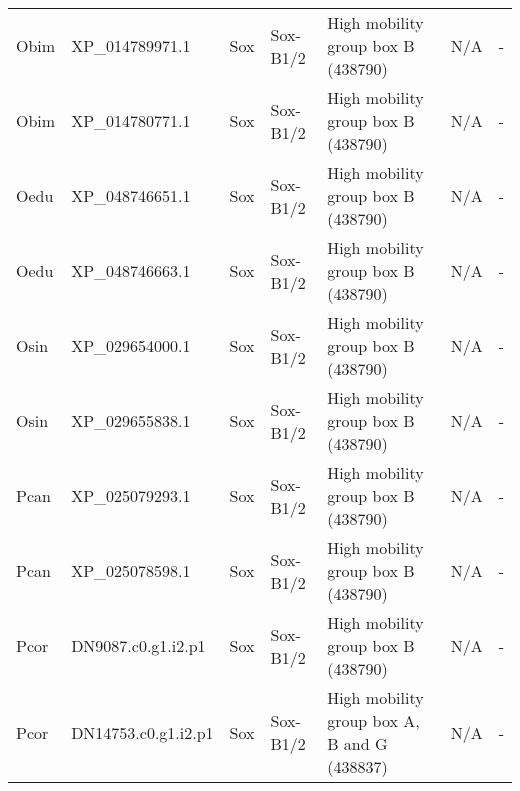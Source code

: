 \documentclass[../main.tex]{subfiles}
\begin{document}
\begin{landscape}
\begin{longtable}{lllllll}
		Obim           & XP\_014789971.1       & Sox            & Sox-B1/2            & High mobility group box B (438790)          & N/A                                                                    & -                    \\
		Obim           & XP\_014780771.1       & Sox            & Sox-B1/2            & High mobility group box B (438790)          & N/A                                                                    & -                    \\
		Oedu           & XP\_048746651.1       & Sox            & Sox-B1/2            & High mobility group box B (438790)          & N/A                                                                    & -                    \\
		Oedu           & XP\_048746663.1       & Sox            & Sox-B1/2            & High mobility group box B (438790)          & N/A                                                                    & -                    \\
		Osin           & XP\_029654000.1       & Sox            & Sox-B1/2            & High mobility group box B (438790)          & N/A                                                                    & -                    \\
		Osin           & XP\_029655838.1       & Sox            & Sox-B1/2            & High mobility group box B (438790)          & N/A                                                                    & -                    \\
		Pcan           & XP\_025079293.1       & Sox            & Sox-B1/2            & High mobility group box B (438790)          & N/A                                                                    & -                    \\
		Pcan           & XP\_025078598.1       & Sox            & Sox-B1/2            & High mobility group box B (438790)          & N/A                                                                    & -                    \\
		Pcor           & DN9087.c0.g1.i2.p1    & Sox            & Sox-B1/2            & High mobility group box B (438790)          & N/A                                                                    & -                    \\
		Pcor           & DN14753.c0.g1.i2.p1   & Sox            & Sox-B1/2            & High mobility group box A, B and G (438837) & N/A                                                                    & -                    \\

\end{longtable}
\end{landscape}
\end{document}

